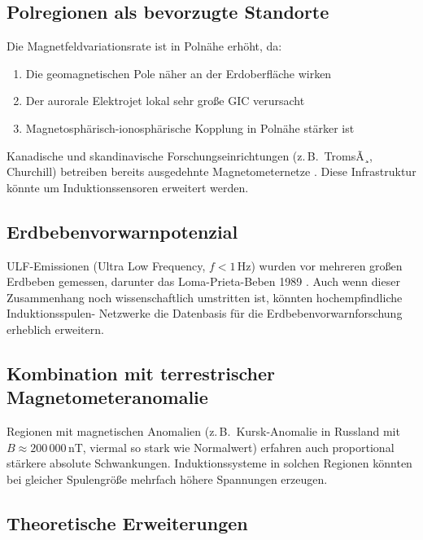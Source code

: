 ﻿\documentclass[a4paper,12pt]{article}
\theoremstyle{definition}
\begin{document}
\subsection{Polregionen als bevorzugte Standorte}

Die Magnetfeldvariationsrate ist in Polnähe erhöht, da:
\begin{enumerate}
    \item Die geomagnetischen Pole n\"aher an der Erdoberfl\"ache wirken
    \item Der aurorale Elektrojet lokal sehr gro{\ss}e GIC verursacht
    \item Magnetosphärisch-ionosph\"arische Kopplung in Polnähe st\"arker ist
\end{enumerate}
Kanadische und skandinavische Forschungseinrichtungen (z.\,B.\ TromsÃ¸,
Churchill) betreiben bereits ausgedehnte Magnetometernetze \cite{mann2008image}.
Diese Infrastruktur k\"onnte um Induktionssensoren erweitert werden.

\subsection{Erdbebenvorwarnpotenzial}

ULF-Emissionen (Ultra Low Frequency, $f < 1\,\mathrm{Hz}$) wurden
vor mehreren gro{\ss}en Erdbeben gemessen, darunter das Loma-Prieta-Beben
1989 \cite{fraser1990anomalous}. Auch wenn dieser Zusammenhang noch
wissenschaftlich umstritten ist, k\"onnten hochempfindliche Induktionsspulen-
Netzwerke die Datenbasis f\"ur die Erdbebenvorwarnforschung erheblich
erweitern.

\subsection{Kombination mit terrestrischer Magnetometeranomalie}

Regionen mit magnetischen Anomalien (z.\,B.\ Kursk-Anomalie in Russland mit
$B \approx 200\,000\,\mathrm{nT}$, viermal so stark wie Normalwert)
erfahren auch proportional stärkere absolute Schwankungen. Induktionssysteme
in solchen Regionen k\"onnten bei gleicher Spulengr\"o{\ss}e mehrfach h\"ohere
Spannungen erzeugen.

\subsection{Theoretische Erweiterungen}
\end{document}
